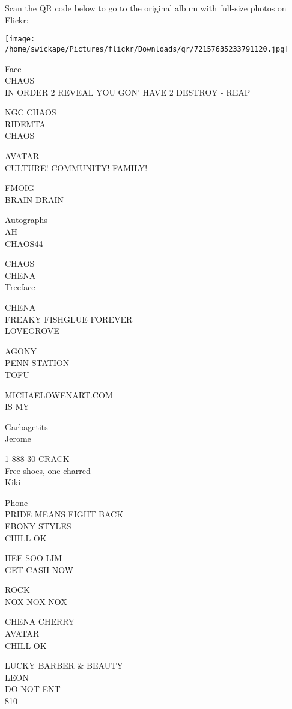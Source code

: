 \documentclass[10pt,letterpaper]{article}
\begin{document}
Scan the QR code below to go to the original album with full-size photos on Flickr:

\texttt{[image: /home/swickape/Pictures/flickr/Downloads/qr/72157635233791120.jpg]}
\pagebreak

Face\\
CHAOS\\
IN ORDER 2 REVEAL YOU GON' HAVE 2 DESTROY {-} REAP

NGC CHAOS\\
RIDEMTA\\
CHAOS

AVATAR\\
CULTURE! COMMUNITY! FAMILY!

FMOIG\\
BRAIN DRAIN

Autographs\\
AH\\
CHAOS44

CHAOS\\
CHENA\\
Treeface

CHENA\\
FREAKY FISHGLUE FOREVER\\
LOVEGROVE

AGONY\\
PENN STATION\\
TOFU

MICHAELOWENART.COM\\
IS MY

Garbagetits\\
Jerome

1{-}888{-}30{-}CRACK\\
Free shoes, one charred\\
Kiki

Phone\\
PRIDE MEANS FIGHT BACK\\
EBONY STYLES\\
CHILL OK

HEE SOO LIM\\
GET CASH NOW

ROCK\\
NOX NOX NOX

CHENA CHERRY\\
AVATAR\\
CHILL OK

LUCKY BARBER \& BEAUTY\\
LEON\\
DO NOT ENT\\
810
\end{document}
